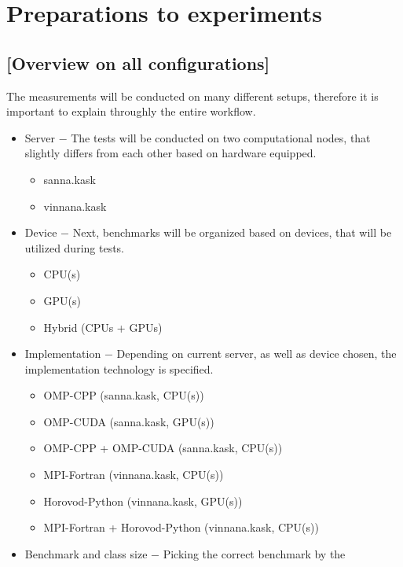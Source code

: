 \chapter{Preparations to experiments}

\section{[Overview on all configurations]}

The measurements will be conducted on many different setups, therefore it is
important to explain throughly the entire workflow.

\begin{itemize}
    \item Server $-$ The tests will be conducted on two computational
    nodes, that slightly differs from each other based on hardware equipped.
        \begin{itemize}
            \item sanna.kask
            \item vinnana.kask
        \end{itemize}
    \item Device $-$ Next, benchmarks will be organized based on devices,
    that will be utilized during tests.
        \begin{itemize}
            \item CPU\@(s)
            \item GPU\@(s)
            \item Hybrid (CPUs + GPUs)
        \end{itemize}
    \item Implementation $-$ Depending on current server, as well as device
    chosen, the implementation technology is specified.
        \begin{itemize}
            \item OMP-CPP (sanna.kask, CPU\@(s))
            \item OMP-CUDA (sanna.kask, GPU\@(s))
            \item OMP-CPP + OMP-CUDA (sanna.kask, CPU\@(s))
            \item MPI-Fortran (vinnana.kask, CPU\@(s))
            \item Horovod-Python (vinnana.kask, GPU\@(s))
            \item MPI-Fortran + Horovod-Python (vinnana.kask, CPU\@(s))
        \end{itemize}
    \item Benchmark and class size $-$ Picking the correct benchmark by the

\end{itemize}
